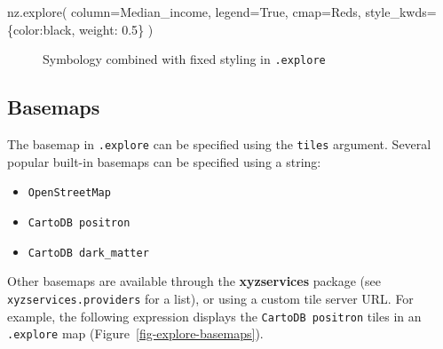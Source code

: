 \documentclass[
  letterpaper,
]{krantz}
\newenvironment{Shaded}{\begin{snugshade}}{\end{snugshade}}
\newcommand{\FloatTok}[1]{\textcolor[rgb]{0.68,0.00,0.00}{#1}}
\newcommand{\NormalTok}[1]{\textcolor[rgb]{0.00,0.23,0.31}{#1}}
\newcommand{\OperatorTok}[1]{\textcolor[rgb]{0.37,0.37,0.37}{#1}}
\newcommand{\StringTok}[1]{\textcolor[rgb]{0.13,0.47,0.30}{#1}}
\newcommand{\VariableTok}[1]{\textcolor[rgb]{0.07,0.07,0.07}{#1}}
\providecommand{\tightlist}{%
  \setlength{\itemsep}{0pt}\setlength{\parskip}{0pt}}\usepackage{longtable,booktabs,array}
\begin{document}
\begin{Shaded}
\begin{Highlighting}[]
\NormalTok{nz.explore(}
\NormalTok{    column}\OperatorTok{=}\StringTok{\textquotesingle{}Median\_income\textquotesingle{}}\NormalTok{, }
\NormalTok{    legend}\OperatorTok{=}\VariableTok{True}\NormalTok{, }
\NormalTok{    cmap}\OperatorTok{=}\StringTok{\textquotesingle{}Reds\textquotesingle{}}\NormalTok{,}
\NormalTok{    style\_kwds}\OperatorTok{=}\NormalTok{\{}\StringTok{\textquotesingle{}color\textquotesingle{}}\NormalTok{:}\StringTok{\textquotesingle{}black\textquotesingle{}}\NormalTok{, }\StringTok{\textquotesingle{}weight\textquotesingle{}}\NormalTok{: }\FloatTok{0.5}\NormalTok{\}}
\NormalTok{)}
\end{Highlighting}
\end{Shaded}

\begin{figure}


\caption{\label{fig-explore-symbology2}Symbology combined with fixed
styling in \texttt{.explore}}

\end{figure}%

\subsection{Basemaps}\label{basemaps-1}

The basemap in \texttt{.explore} can be specified using the
\texttt{tiles} argument. Several popular built-in basemaps can be
specified using a string:

\begin{itemize}
\tightlist
\item
  \texttt{\textquotesingle{}OpenStreetMap\textquotesingle{}}
\item
  \texttt{\textquotesingle{}CartoDB\ positron\textquotesingle{}}
\item
  \texttt{\textquotesingle{}CartoDB\ dark\_matter\textquotesingle{}}
\end{itemize}

Other basemaps are available through the \textbf{xyzservices} package
(see \texttt{xyzservices.providers} for a list), or using a custom tile
server URL. For example, the following expression displays the
\texttt{\textquotesingle{}CartoDB\ positron\textquotesingle{}} tiles in
an \texttt{.explore} map (Figure~\ref{fig-explore-basemaps}).
\end{document}
